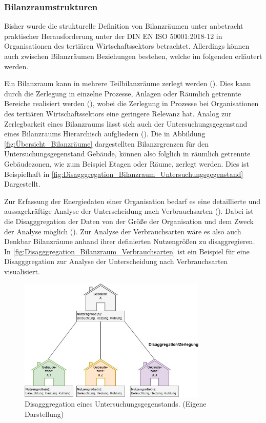 \subsubsection{Bilanzraumstrukturen}
Bisher wurde die strukturelle Definition von Bilanzräumen unter anbetracht praktischer Herausforderung unter der DIN EN ISO 50001:2018-12 in Organisationen 
des tertiären Wirtschaftssektors betrachtet. Allerdings können auch zwischen Bilanzräumen Beziehungen bestehen, welche im folgenden erläutert werden.

Ein Bilanzraum kann in mehrere Teilbilanzräume zerlegt werden (\cite[S. 310]{Engelmann.2015}). Dies kann durch die Zerlegung in einzelne Prozesse, 
Anlagen oder Räumlich getrennte Bereiche realisiert werden (\cite[S. 310]{Engelmann.2015}), wobei die Zerlegung in Prozesse bei Organisationen des tertiären 
Wirtschaftssektors eine geringere Relevanz hat.
Analog zur Zerlegbarkeit eines Bilanzraums lässt sich auch der Untersuchungsgegenstand eines Bilanzraums Hierarchisch aufgliedern (\cite[S. 109]{Miller.2016}).
Die in Abbildung \eqref{fig:Übersicht_Bilanzräume} dargestellten Bilanzrgrenzen für den Untersuchungsgegenstand Gebäude, können also folglich 
in räumlich getrennte Gebäudezonen, wie zum Beispiel Etagen oder Räume, zerlegt werden. Dies ist Beispielhaft in \eqref{fig:Disagggregation_Bilanzraum_Untersuchungsgegenstand} 
Dargestellt.  

Zur Erfassung der Energiedaten einer Organisation bedarf es eine detaillierte und aussagekräftige Analyse der Unterscheidung nach Verbrauchsarten 
(\cite[S. 14]{Hohnhold.2013}). Dabei ist die Disagggregation der Daten von der Größe der Organisation und dem Zweck der Analyse möglich (\cite[S. 14f.]{Hohnhold.2013}).
Zur Analyse der Verbrauchsarten wäre es also auch Denkbar Bilanzräume anhand ihrer definierten Nutzengrößen zu disaggregieren. 
In \eqref{fig:Disagggregation_Bilanzraum_Verbrauchsarten} ist ein Beispiel für eine Disagggregation zur Analyse der Unterscheidung nach Verbrauchsarten visualisiert.


\begin{figure}[H]
    \centering
    \includegraphics[width=0.8\textwidth]{../../Ressourcen/Abbildungen/Untersuchungsgegenstand_Zerlegt.jpg}
    \caption{Disagggregation eines Untersuchungsgegenstands. (Eigene Darstellung)}
    \label{fig:Disagggregation_Bilanzraum_Untersuchungsgegenstand}
\end{figure}

